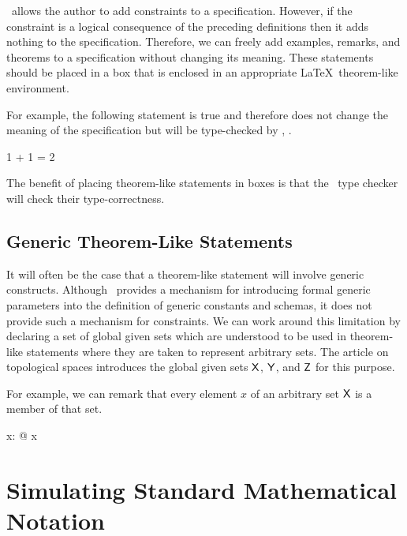 \documentclass[11pt, oneside]{article}
\begin{document}
\Zed\ allows the author to add constraints to a specification.
However, if the constraint is a logical consequence of the preceding definitions then it adds nothing to the specification.
Therefore, we can freely add examples, remarks, and theorems to a specification without changing its meaning.
These statements should be placed in a  box that is enclosed in an appropriate \LaTeX\ theorem-like environment.

For example, the following statement is true and therefore does not change the meaning of
the specification but will be type-checked by \fuzz, .

\begin{example}

\begin{zed}
	1 + 1 = 2
\end{zed}
	
\end{example}

The benefit of placing theorem-like statements in  boxes is that the \fuzz\ type checker will check their type-correctness.

\subsection{Generic Theorem-Like Statements}

It will often be the case that a theorem-like statement will involve generic constructs.
Although \Zed\ provides a mechanism for introducing formal generic parameters into the definition of 
generic constants and schemas, it does not provide such a mechanism for constraints.
We can work around this limitation by declaring a set of global given sets which are understood to be used in theorem-like
statements where they are taken to represent arbitrary sets.
The article on topological spaces introduces the global given sets $\mathsf{X}$, $\mathsf{Y}$, and $\mathsf{Z}$ for this purpose.

For example, we can remark that every element $x$ of an arbitrary set $\mathsf{X}$ is a member of that set.

\begin{remark}

\begin{zed}
	\forall x: \setX @ x \in \setX
\end{zed}

\end{remark}

\section{Simulating Standard Mathematical Notation}
\end{document}

